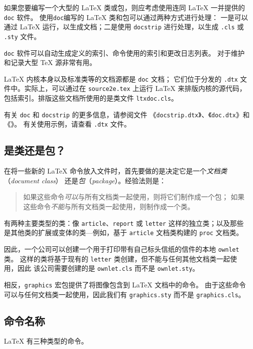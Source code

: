 \documentclass{ltxguide}[1995/11/28]
\begin{document}
如果您要编写一个大型的 \LaTeX{} 类或包，则应考虑使用连同 \LaTeX{} 一并提供的
\verb|doc| 软件。
使用\verb|doc|编写的 \LaTeX{} 类和包可以通过两种方式进行处理：
一是可以通过 \LaTeX{} 运行，以生成文档；二是使用 \verb|docstrip|
进行处理，以生成 \verb|.cls| 或 \verb|.sty| 文件。

\verb|doc| 软件可以自动生成定义的索引、命令使用的索引和更改日志列表。
对于维护和记录大型 \TeX{} 源非常有用。

\LaTeX{} 内核本身以及标准类等的文档源都是 \verb|doc| 文档；
它们位于分发的 \verb|.dtx| 文件中。实际上，可以通过在
\verb|source2e.tex| 上运行 \LaTeX{} 来排版内核的源代码，
包括索引。排版这些文档所使用的是类文件 \verb|ltxdoc.cls|。

有关 \verb|doc| 和 \verb|docstrip| 的更多信息，请参阅文件
《\verb|docstrip.dtx|》、《\verb|doc.dtx|》和《\emph{\LaTeXcomp}》。
有关使用示例，请查看 \verb|.dtx| 文件。

\subsection{是类还是包？}
\label{Sec:classorpkg}

在将一些新的 \LaTeX{} 命令放入文件时，首先要做的是决定它是一个\emph{文档类}（\emph{document class}）
还是\emph{包}（\emph{package}）。经验法则是：
\begin{quote}
	如果这些命令\emph{可以}与所有文档类一起使用，则将它们制作成一个包；
	如果这些命令\emph{不能}与所有文档类一起使用，则制作成一个类。
\end{quote}

有两种主要类型的类：像 \verb|article|、\verb|report| 或 \verb|letter|
这样的独立类；以及那些是其他类的扩展或变体的类---例如，基于 \verb|article|
文档类构建的 \verb|proc| 文档类。

因此，一个公司可以创建一个用于打印带有自己标头信纸的信件的本地 \verb|ownlet| 类。
这样的类将基于现有的 \verb|letter| 类创建，但不能与任何其他文档类一起使用，因此
该公司需要创建的是 \verb|ownlet.cls| 而不是 \verb|ownlet.sty|。

相反，\verb|graphics| 宏包提供了将图像包含到 \LaTeX{} 文档中的命令。
由于这些命令可以与任何文档类一起使用，因此我们有 \verb|graphics.sty|
而不是 \verb|graphics.cls|。

\subsection{命令名称}

\LaTeX{} 有三种类型的命令。
\end{document}
